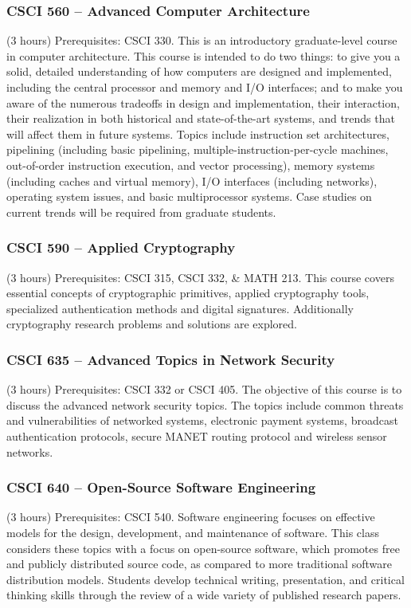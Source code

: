 \subsubsection{CSCI 560 -- Advanced Computer Architecture}
(3 hours) Prerequisites: CSCI 330. This is an introductory graduate-level course in computer architecture. This course is intended to do two things: to give you a solid, detailed understanding of how computers are designed and implemented, including the central processor and memory and I/O interfaces; and to make you aware of the numerous tradeoffs in design and implementation, their interaction, their realization in both historical and state-of-the-art systems, and trends that will affect them in future systems. Topics include instruction set architectures, pipelining (including basic pipelining, multiple-instruction-per-cycle machines, out-of-order instruction execution, and vector processing), memory systems (including caches and virtual memory), I/O interfaces (including networks), operating system issues, and basic multiprocessor systems.  Case studies on current trends will be required from graduate students. 

\subsubsection{CSCI 590 -- Applied Cryptography}
(3 hours) Prerequisites:  CSCI 315, CSCI 332, \& MATH 213. This course covers essential concepts of cryptographic primitives, applied cryptography tools, specialized authentication methods and digital signatures. Additionally cryptography research problems and solutions are explored.

\subsubsection{CSCI 635 -- Advanced Topics in Network Security}
(3 hours) Prerequisites:  CSCI 332 or CSCI 405. The objective of this course is to discuss the advanced network security topics. The topics include common threats and vulnerabilities of networked systems, electronic payment systems, broadcast authentication protocols, secure MANET routing protocol and wireless sensor networks. 

\subsubsection{CSCI 640 -- Open-Source Software Engineering}
(3 hours) Prerequisites: CSCI 540. Software engineering focuses on effective models for the design, development, and maintenance of software. This class considers these topics with a focus on open-source software, which promotes free and publicly distributed source code, as compared to more traditional software distribution models. Students develop technical writing, presentation, and critical thinking skills through the review of a wide variety of published research papers.

